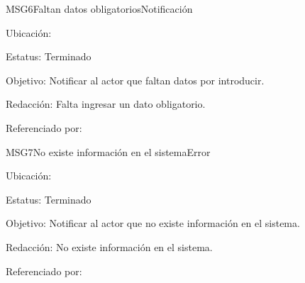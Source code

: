 \begin{mensaje}{MSG6}{Faltan datos obligatorios}{Notificación}
	\item[Ubicación:] \msjEmergente
	\item[Estatus:] Terminado
	\item[Objetivo:] Notificar al actor que faltan datos por introducir.
	\item[Redacción:] Falta ingresar un dato obligatorio.
	\item[Referenciado por:] 
\end{mensaje}

\begin{mensaje}{MSG7}{No existe información en el sistema}{Error}
	\item[Ubicación:] \msjEmergente
	\item[Estatus:] Terminado
	\item[Objetivo:] Notificar al actor que no existe información en el sistema.
	\item[Redacción:] No existe información en el sistema.
	\item[Referenciado por:] 
\end{mensaje}